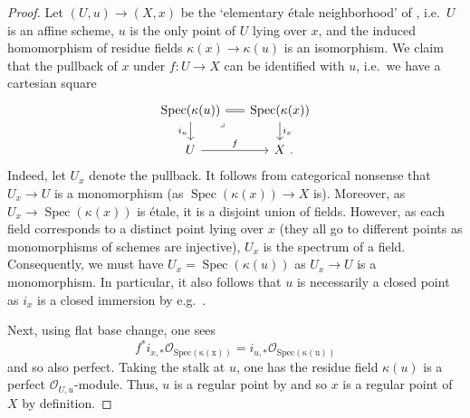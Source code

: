 \documentclass[11pt]{amsart}
\theoremstyle{plain}
\theoremstyle{definition}
\numberwithin{equation}{section}
\numberwithin{theorem}{section}
\begin{document}
\begin{appendix}
\begin{proof}
    Let $(U,u)\to (X,x)$ be the `elementary \'{e}tale neighborhood' of \cite[\href{https://stacks.math.columbia.edu/tag/0BBP}{Tag 0BBP}]{StacksProject}, i.e.\ $U$ is an affine scheme, $u$ is the only point of $U$ lying over $x$, and the induced homomorphism of residue fields $\kappa(x)\to \kappa(u)$ is an isomorphism.
    We claim that the pullback of $x$ under $f\colon U\to X$ can be identified with $u$, i.e.\ we have a cartesian square
    \begin{displaymath}
        \begin{tikzcd}[ampersand replacement=\&, sep = 1.5em]
            {\operatorname{Spec} (\kappa(u))} \& {\operatorname{Spec} (\kappa(x))} \\
            U \& X\rlap{ .}
            \arrow[equal, from=1-1, to=1-2]
            \arrow["i_u"', from=1-1, to=2-1]
            \arrow["i_x", from=1-2, to=2-2]
            \arrow["f",from=2-1, to=2-2]
            \arrow["\lrcorner"{anchor=center, pos=0.125}, draw=none, from=1-1, to=2-2]
        \end{tikzcd}
    \end{displaymath}
    Indeed, let $U_x$ denote the pullback. 
    It follows from categorical nonsense that $U_x\to U$ is a monomorphism (as $\operatorname{Spec}(\kappa(x))\to X$ is).
    Moreover, as $U_x\to \operatorname{Spec} (\kappa(x))$ is \'{e}tale, it is a disjoint union of fields.
    However, as each field corresponds to a distinct point lying over $x$  (they all go to different points as monomorphisms of schemes are injective), $U_x$ is the spectrum of a field.
    Consequently, we must have  $U_x=\operatorname{Spec} (\kappa(u))$ as $U_x\to U$ is a monomorphism.
    In particular, it also follows that $u$ is necessarily a closed point as $i_x$ is a closed immersion by e.g.\ \cite[\href{https://stacks.math.columbia.edu/tag/0H1R}{Tag 0H1R} \& \href{https://stacks.math.columbia.edu/tag/0H1U}{Tag 0H1U}]{StacksProject}.

    Next, using flat base change, one sees 
    \begin{displaymath}
        f^\ast i_{x,\ast}\mathcal{O}_{\operatorname{Spec(\kappa(x))}} = i_{u,\ast}\mathcal{O}_{\operatorname{Spec(\kappa(u))}}
    \end{displaymath}
    and so also perfect.
    Taking the stalk at $u$, one has the residue field $\kappa(u)$ is a perfect $\mathcal{O}_{U,u}$-module.
    Thus, $u$ is a regular point by \cite[\href{https://stacks.math.columbia.edu/tag/00OC}{Tag 00OC}]{StacksProject} and so $x$ is a regular point of $X$ by definition.
\end{proof}


\end{appendix}
\end{document}
